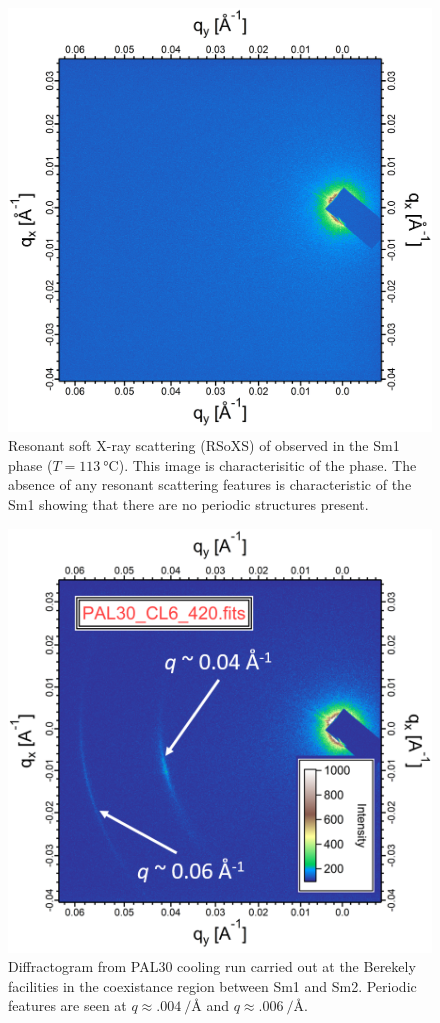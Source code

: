 \begin{figure}[h!]
    \centering
    \includegraphics[width=.8\textwidth]{./figs/pal30/finalFigs/rsosxSmaT113-modified.png}
	\caption{\label{fig:rsoxs-sm1} Resonant soft X-ray scattering (RSoXS) of  observed in
        the Sm1 phase ($T=\SI{113}{\degreeCelsius}$). This image is
        characterisitic of the phase. The absence of any
        resonant scattering features is characteristic of the Sm1 showing that
        there are no periodic
    structures present.}
\end{figure}

\begin{figure}[h!]
    \centering
    \includegraphics[width=.8\textwidth]{./figs/pal30/finalFigs/RSoXS-coexistanenceDiffracto.png}
    \caption{\label{fig:rsoxs-coexistDiff} Diffractogram from PAL30 cooling run
        carried out at the Berekely facilities in the coexistance region between
        Sm1 and Sm2. Periodic features are seen at $q\approx
    \SI[per-mode=reciprocal]{.004}{\per\angstrom}$ and $q\approx
\SI[per-mode=reciprocal]{.006}{\per\angstrom}$.}
\end{figure}

